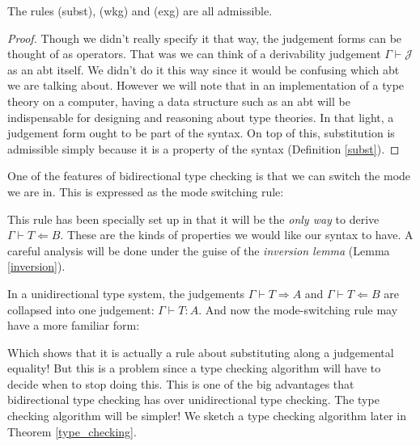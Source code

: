 \begin{lemma}
    The rules (subst), (wkg) and (exg) are all admissible.
\end{lemma}

\begin{proof}
    Though we didn't really specify it that way, the judgement forms can be thought of as operators. That was we can think of a derivability judgement $\Gamma \vdash \mathcal{J}$ as an abt itself. We didn't do it this way since it would be confusing which abt we are talking about. However we will note that in an implementation of a type theory on a computer, having a data structure such as an abt will be indispensable for designing and reasoning about type theories. In that light, a judgement form ought to be part of the syntax. On top of this, substitution is admissible simply because it is a property of the syntax (Definition \ref{subst}).
\end{proof}

\begin{defin}
    One of the features of bidirectional type checking is that we can switch the mode we are in. This is expressed as the mode switching rule:

    \begin{prooftree}
    \end{prooftree}
\end{defin}

\begin{remark}
    This rule has been specially set up in that it will be the \emph{only way} to derive $\Gamma \vdash T \Leftarrow B$. These are the kinds of properties we would like our syntax to have. A careful analysis will be done under the guise of the \emph{inversion lemma} (Lemma \ref{inversion}).

    In a unidirectional type system, the judgements $\Gamma \vdash T \Rightarrow A$ and $\Gamma \vdash T \Leftarrow B$ are collapsed into one judgement: $\Gamma \vdash T : A$. And now the mode-switching rule may have a more familiar form:

    \begin{prooftree}
    \end{prooftree}

    Which shows that it is actually a rule about substituting along a judgemental equality! But this is a problem since a type checking algorithm will have to decide when to stop doing this. This is one of the big advantages that bidirectional type checking has over unidirectional type checking. The type checking algorithm will be simpler! \cite{COQUAND1996167} We sketch a type checking algorithm later in Theorem \ref{type_checking}.
\end{remark}

